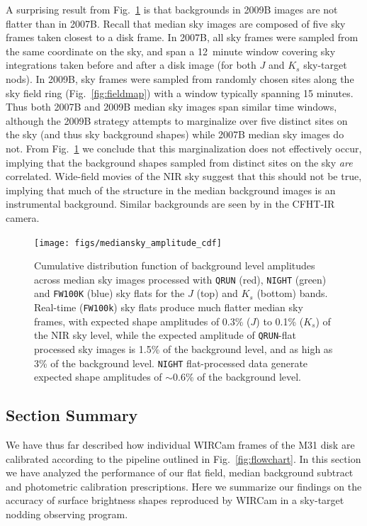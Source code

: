 \documentclass[iop]{emulateapj}
\newcommand{\Fig}[1]{Fig.~\ref{fig:#1}}  %
\begin{document}
A surprising result from \Fig{mediansky_amplitude} is that backgrounds in 2009B images are not flatter than in 2007B.
Recall that median sky images are composed of five sky frames taken closest to a disk frame.
In 2007B, all sky frames were sampled from the same coordinate on the sky, and span a 12~minute window covering sky integrations taken before and after a disk image (for both $J$ and $K_s$ sky-target nods).
In 2009B, sky frames were sampled from randomly chosen sites along the sky field ring (\Fig{fieldmap}) with a window typically spanning 15 minutes.
Thus both 2007B and 2009B median sky images span similar time windows, although the 2009B strategy attempts to marginalize over five distinct sites  on the sky (and thus sky background shapes) while 2007B median sky images do not.
From \Fig{mediansky_amplitude} we conclude that this marginalization does not effectively occur, implying that the background shapes sampled from distinct sites on the sky \emph{are} correlated.
Wide-field movies of the NIR sky \citep{Adams:1996} suggest that this should not be true, implying that much of the structure in the median background images is an instrumental background.
Similar backgrounds are seen by \cite{Vaduvescu:2004} in the CFHT-IR camera.

\begin{figure}[t]
\centering
\texttt{[image: figs/mediansky\_amplitude\_cdf]}
\caption{Cumulative distribution function of background level amplitudes across median sky images processed with \texttt{QRUN} (red), \texttt{NIGHT} (green) and \texttt{FW100K} (blue) sky flats for the $J$ (top) and $K_s$ (bottom) bands. Real-time (\texttt{FW100k}) sky flats produce much flatter median sky frames, with expected shape amplitudes of 0.3\% ($J$) to 0.1\% ($K_s$) of the NIR sky level, while the expected amplitude of \texttt{QRUN}-flat processed sky images is 1.5\% of the background level, and as high as 3\% of the background level. \texttt{NIGHT} flat-processed data generate expected shape amplitudes of $\sim 0.6\%$ of the background level.
}
\label{fig:mediansky_amplitude}
\end{figure}


\subsection{Section Summary}
\label{sec:shapeconclusions}

We have thus far described how individual WIRCam frames of the M31 disk are calibrated according to the pipeline outlined in \Fig{flowchart}.
In this section we have analyzed the performance of our flat field, median background subtract and photometric calibration prescriptions.
Here we summarize our findings on the accuracy of surface brightness shapes reproduced by WIRCam in a sky-target nodding observing program.
\end{document}
